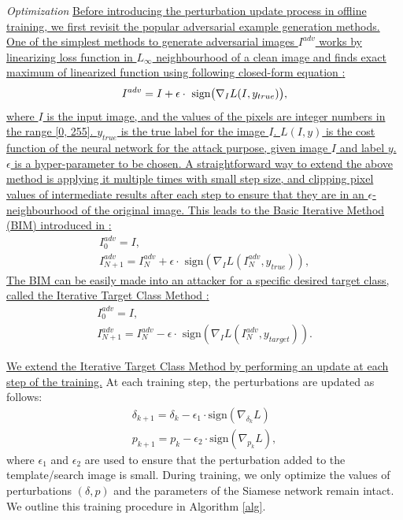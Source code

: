 \documentclass[journal]{IEEEtran}
\begin{document}
\textit{Optimization}
\uline{Before introducing the perturbation update process in offline training, we first revisit the popular adversarial example generation methods. One of the simplest methods to generate adversarial images $I^{adv}$ works by linearizing loss function in $L_{\infty}$ neighbourhood of a clean image and finds exact maximum of linearized function using following closed-form equation \cite{FGSM}:}
\begin{equation}
    I^{adv} = I + \epsilon \cdot \text{ sign} \bigl( \nabla_I L(I, y_{true})  \bigr),
    \vspace{-0.1cm}
\end{equation}
\uline{where $I$ is the input image, and the values of the pixels are integer numbers in the range [0, 255]. $y_{true}$ is the true label for the image $I$. $L(I, y)$ is the cost function of the neural network for the attack purpose, given image $I$ and label $y$. $\epsilon$ is a hyper-parameter to be chosen. A straightforward way to extend the above method is applying it multiple times with small step size, and clipping pixel values of intermediate results after each step to ensure that they are in an $\epsilon$-neighbourhood of the original image.  This leads to the Basic Iterative Method (BIM) introduced in \cite{DBLP:conf/iclr/KurakinGB17a}:}
\begin{equation}
    \begin{gathered}
        I_0^{adv} = I, \\
        I_{N+1}^{adv} = I_N^{adv}+\epsilon \cdot \text{ sign}(\nabla_I L(I_N^{adv},y_{true})),
    \end{gathered}
\end{equation}
\uline{The BIM can be easily made into an attacker for a specific desired target class, called the Iterative Target Class Method \cite{DBLP:conf/iclr/KurakinGB17a}:}
\begin{equation}
  \begin{gathered}
      I_0^{adv} = I,\\
      I_{N+1}^{adv} = I_N^{adv}-\epsilon \cdot \text{ sign}(\nabla_I L(I_N^{adv},y_{target})).
  \end{gathered}
  \label{equ:itcm}
\end{equation}

\uline{We extend the Iterative Target Class Method by performing an update at each step of the training.}
At each training step, the perturbations are updated as follows:
\begin{gather}
\delta_{k+1} = \delta_{k} - \epsilon_1 \cdot \text{sign}(\nabla_{\delta_k}L)\\
p_{k+1} = p_{k} - \epsilon_2 \cdot \text{sign}(\nabla_{p_k}L),
\end{gather}
where $\epsilon_1$ and $\epsilon_2$ are used to ensure that the perturbation added to the template/search image is small.
During training, we only optimize the values of perturbations $(\delta, p)$ and the parameters of the Siamese network remain intact. We outline this training procedure in Algorithm \ref{alg}.
\end{document}
